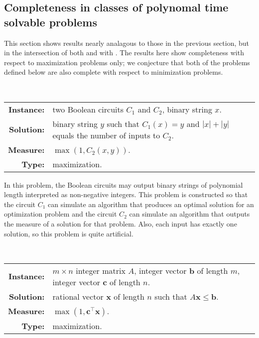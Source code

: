\documentclass[]{article}
\begin{document}
\subsection{Completeness in classes of polynomal time solvable problems}

This section shows results nearly analagous to those in the previous section, but in the intersection of both \NPO{} and \NNCO{} with \PO.
The results here show completeness with respect to maximization problems only; we conjecture that both of the problems defined below are also complete with respect to minimization problems.

\begin{definition}
  \mbox{} \\
  \begin{tabular}{r p{9.5cm}}
    \textbf{Instance:} & two Boolean circuits $C_1$ and $C_2$, binary string $x$. \\
    \textbf{Solution:} & binary string $y$ such that $C_1(x) = y$ and $|x| + |y|$ equals the number of inputs to $C_2$. \\
    \textbf{Measure:} & $\max(1, C_2(x, y))$. \\
    \textbf{Type:} & maximization.
  \end{tabular}
\end{definition}

In this problem, the Boolean circuits may output binary strings of polynomial length interpreted as non-negative integers.
This problem is constructed so that the circuit $C_1$ can simulate an algorithm that produces an optimal solution for an optimization problem and the circuit $C_2$ can simulate an algorithm that outputs the measure of a solution for that problem.
Also, each input has exactly one solution, so this problem is quite artificial.

\begin{definition}
  \mbox{} \\
  \begin{tabular}{r p{9.5cm}}
    \textbf{Instance:} & $m \times n$ integer matrix $A$, integer vector $\mathbf{b}$ of length $m$, integer vector $\mathbf{c}$ of length $n$. \\
    \textbf{Solution:} & rational vector $\mathbf{x}$ of length $n$ such that $A \mathbf{x} \leq \mathbf{b}$. \\
    \textbf{Measure:} & $\max(1, \mathbf{c}^\intercal \mathbf{x})$. \\
    \textbf{Type:} & maximization.
  \end{tabular}
\end{definition}
\end{document}
